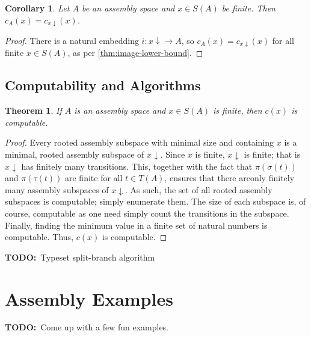 \documentclass[aps,prd,onecolumn,nofootinbib,letterpaper,preprintnumbers,superscriptaddress,eqsecnum]{revtex4}
\newtheorem{corollary}{Corollary}
\newtheorem{theorem}{Theorem}
\theoremstyle{definition}
\newcommand{\downset}[1]{#1\!\!\downarrow}
\newcommand{\TODO}{\noindent\textbf{TODO:}~}
\begin{document}
\begin{corollary}\label{cor:lowerset-index}
    Let $A$ be an assembly space and $x \in S(A)$ be finite.
    Then $c_A(x) = c_{x\downarrow}(x)$.
\end{corollary}
\begin{proof}
    There is a natural embedding $i : \downset{x} \rightarrow A$, so $c_A(x) = c_{x\downarrow}(x)$ for all finite $x \in S(A)$, as per \cref{thm:image-lower-bound}.
\end{proof}

\subsection{Computability and Algorithms}

\begin{theorem}\label{thm:computable}
    If $A$ is an assembly space and $x \in S(A)$ is finite, then $c(x)$ is computable.
\end{theorem}
\begin{proof}
    Every rooted assembly subspace with minimal size and containing $x$ is a minimal, rooted assembly subspace of $\downset{x}$.
    Since $x$ is finite, $\downset{x}$ is finite; that is $\downset{x}$ has finitely many transitions.
    This, together with the fact that $\pi(\sigma(t))$ and $\pi(\tau(t))$ are finite for all $t \in T(A)$, ensures that there areonly finitely many assembly subspaces of $\downset{x}$.
    As such, the set of all rooted assembly subspaces is computable; simply enumerate them.
    The size of each subspace is, of course, computable as one need simply count the transitions in the subspace.
    Finally, finding the minimum value in a finite set of natural numbers is computable.
    Thus, $c(x)$ is computable.
\end{proof}

\TODO Typeset split-branch algorithm

\section{Assembly Examples}

\TODO Come up with a few fun examples.
\end{document}
